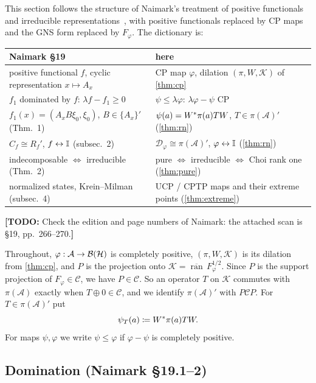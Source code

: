 \documentclass[12pt]{article}
\newcommand{\todo}[1]{\textcolor{\mysubcolor}{\small\textbf{[TODO:} #1\textbf{]}}}
\newcommand{\alg}{\mathcal{A}}             %
\newcommand{\hilb}{\mathcal{H}}            %
\newcommand{\dil}{\mathcal{K}}             %
\newcommand{\bdd}[1]{\mathcal{B}\br{#1}}   %
\newcommand{\Fphi}{F_{\varphi}}
\newcommand{\comm}{\mathcal{C}}            %
\newcommand{\ran}{\operatorname{ran}}
\begin{document}
This section follows the structure of Naimark's treatment of positive functionals
and irreducible representations~\cite[\S19]{Naimark1972}, with positive functionals
replaced by CP maps and the GNS form replaced by \(\Fphi\). The dictionary is:
\begin{center}
\small
\begin{tabular}{p{}p{}}
  Naimark \S19 & here \\ \hline
  positive functional \(f\), cyclic representation \(x \mapsto A_x\)
    & CP map \(\varphi\), dilation \((\pi, W, \dil)\) of \cref{thm:cp} \\
  \(f_1\) dominated by \(f\): \(\lambda f - f_1 \ge 0\)
    & \(\psi \le \lambda\varphi\): \(\lambda\varphi - \psi\) CP \\
  \(f_1(x) = (A_x B\xi_0, \xi_0)\), \(B \in \{A_x\}'\) (Thm.~1)
    & \(\psi(a) = W^*\pi(a)TW\), \(T \in \pi(\alg)'\) (\cref{thm:rn}) \\
  \(C_f \cong R_f'\), \(f \leftrightarrow {\mathbb I}\) (subsec.~2)
    & \(\mathcal{D}_\varphi \cong \pi(\alg)'\), \(\varphi \leftrightarrow {\mathbb I}\) (\cref{thm:rn}) \\
  indecomposable \(\Leftrightarrow\) irreducible (Thm.~2)
    & pure \(\Leftrightarrow\) irreducible \(\Leftrightarrow\) Choi rank one (\cref{thm:pure}) \\
  normalized states, Krein--Milman (subsec.~4)
    & UCP / CPTP maps and their extreme points (\cref{thm:extreme}) \\
\end{tabular}
\end{center}
\todo{Check the edition and page numbers of Naimark: the attached scan is
\S19, pp.~266--270.}

Throughout, \(\varphi : \alg \to \bdd\hilb\) is completely positive,
\((\pi, W, \dil)\) is its dilation from \cref{thm:cp}, and \(P\) is the projection
onto \(\dil = \overline{\ran}\,\Fphi^{1/2}\). Since \(P\) is the support projection
of \(\Fphi \in \comm\), we have \(P \in \comm\). So an operator \(T\) on \(\dil\)
commutes with \(\pi(\alg)\) exactly when \(T \oplus 0 \in \comm\), and we identify
\(\pi(\alg)'\) with \(P\comm P\). For \(T \in \pi(\alg)'\) put
\[
  \psi_T(a) \coloneqq W^* \pi(a) T W .
\]
For maps \(\psi, \varphi\) we write \(\psi \le \varphi\) if \(\varphi - \psi\) is
completely positive.

\subsection{Domination (Naimark \S19.1--2)}
\label{sec:domination}
\end{document}

